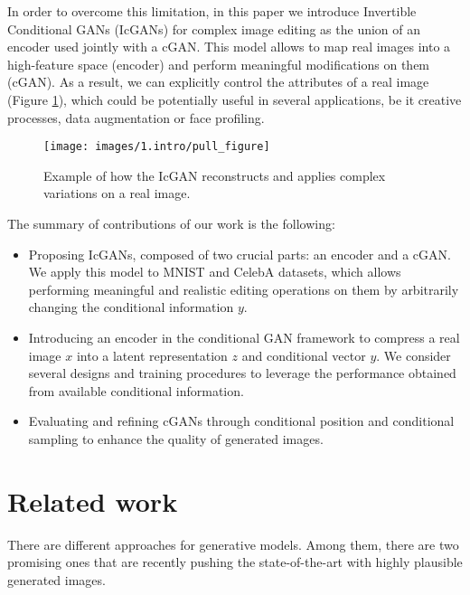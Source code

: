 \documentclass{article}
\begin{document}
In order to overcome this limitation, in this paper we introduce Invertible Conditional GANs (IcGANs) for complex image editing as the union of an encoder used jointly with a cGAN. This model allows to map real images into a high-feature space (encoder) and perform meaningful modifications on them (cGAN). As a result, we can explicitly control the attributes of a real image (Figure \ref{fig:icgan_example}), which could be potentially useful in several applications, be it creative processes, data augmentation or face profiling.

\begin{figure}[t]
        \centering
        \texttt{[image: images/1.intro/pull\_figure]}
        \caption{Example of how the IcGAN reconstructs and applies complex variations on a real image.}
        \label{fig:icgan_example}
\end{figure}

\begin{minipage}{\linewidth} The summary of contributions of our work is the following:
\begin{itemize}
\item Proposing IcGANs, composed of two crucial parts: an encoder and a cGAN. We apply this model to MNIST \citep{LeCun1998} and CelebA \citep{celeba} datasets, which allows performing meaningful and realistic editing operations on them by arbitrarily changing the conditional information $y$.   
\item Introducing an encoder in the conditional GAN framework to compress a real image $x$ into a latent representation $z$ and conditional vector $y$. We consider several designs and training procedures to leverage the performance obtained from available conditional information.
\item Evaluating and refining cGANs through conditional position and conditional sampling to enhance the quality of generated images.
\end{itemize}
\end{minipage} 
\section{Related work} \label{sec:state_of_art}
There are different approaches for generative models. Among them, there are two promising ones that are recently pushing the state-of-the-art with highly plausible generated images.
\end{document}
